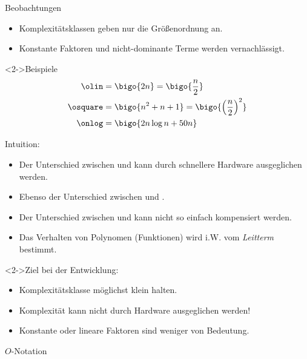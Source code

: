 \begin{frame}
    \begin{block}{Beobachtungen}
        \begin{itemize}
            \item Komplexitätsklassen geben nur die Größenordnung an.
            \item Konstante Faktoren und nicht-dominante Terme werden vernachlässigt.
        \end{itemize}
    \end{block}
    \begin{block}<2->{Beispiele}
        \vspace{-3ex}
        \begin{align*}
            \olin &= \bigo{2n} = \bigo{\frac{n}{2}} \\
            \osquare &= \bigo{n^2+n+1} = \bigo{\left(\frac{n}{2}\right)^2} \\
            \onlog &= \bigo{2n \log n  + 50n}
        \end{align*}
    \end{block}
\end{frame}

\begin{frame}
    \begin{block}{Intuition:}
        \begin{itemize}
            \item Der Unterschied zwischen \olin und  kann durch schnellere Hardware ausgeglichen werden.
            \item Ebenso der Unterschied zwischen \osquare und .
            \item Der Unterschied zwischen \olin und \osquare kann nicht so einfach kompensiert werden.
            \item Das Verhalten von Polynomen (Funktionen) wird i.W. vom \emph{Leitterm} bestimmt.
        \end{itemize}
    \end{block}
    \begin{block}<2->{Ziel bei der Entwicklung:}
        \begin{itemize}
            \item Komplexitätsklasse möglichst klein halten.
            \item \alert{Komplexität kann nicht durch Hardware ausgeglichen werden!}
            \item Konstante oder lineare Faktoren sind weniger von Bedeutung.
        \end{itemize}
    \end{block}
\end{frame}
    
\begin{frame}
    \begin{defblock}{$O$-Notation}
    \end{defblock}
\end{frame}
